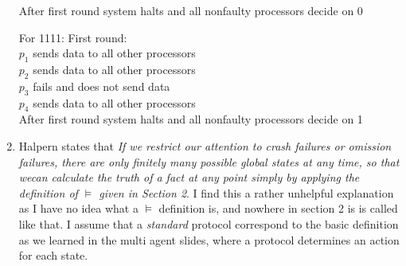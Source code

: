 \documentclass[12pt]{article} %
\begin{document}
\begin{enumerate}
        After first round system halts and all nonfaulty processors decide on 0

        For 1111:
        First round:\\
        $p_1$ sends data to all other processors\\
        $p_2$ sends data to all other processors\\
        $p_3$ fails and does not send data\\
        $p_4$ sends data to all other processors\\
        
        After first round system halts and all nonfaulty processors decide on 1


    \item
        Halpern  states that 
        \emph{If we restrict our
            attention to crash failures or omission
            failures, there are only finitely many
            possible global states at any time, so that wecan calculate the truth of a
            fact at any point simply by applying the definition of $\models$ given in Section 2}.
        I find this a rather unhelpful explanation as I have no idea what a
        $\models$ definition is, and nowhere in section 2 is is called like
        that.
        I assume that a \emph{standard} protocol correspond to the basic
        definition as we learned in the multi agent slides, where a protocol
        determines an action for each state.\\
\end{enumerate}
\end{document}
